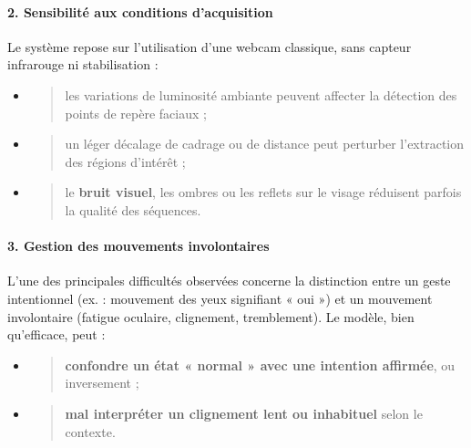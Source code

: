 \documentclass[
]{article}
\begin{document}
\hypertarget{sensibilituxe9-aux-conditions-dacquisition}{%
\paragraph{\texorpdfstring{\textbf{2. Sensibilité aux conditions d'acquisition}}{2. Sensibilité aux conditions d'acquisition}}\label{sensibilituxe9-aux-conditions-dacquisition}}

Le système repose sur l'utilisation d'une webcam classique, sans capteur infrarouge ni stabilisation :

\begin{itemize}
\item
  \begin{quote}
  les variations de luminosité ambiante peuvent affecter la détection des points de repère faciaux ;
  \end{quote}
\item
  \begin{quote}
  un léger décalage de cadrage ou de distance peut perturber l'extraction des régions d'intérêt ;
  \end{quote}
\item
  \begin{quote}
  le \textbf{bruit visuel}, les ombres ou les reflets sur le visage réduisent parfois la qualité des séquences.
  \end{quote}
\end{itemize}

\hypertarget{gestion-des-mouvements-involontaires}{%
\paragraph{\texorpdfstring{\textbf{3. Gestion des mouvements involontaires}}{3. Gestion des mouvements involontaires}}\label{gestion-des-mouvements-involontaires}}

L'une des principales difficultés observées concerne la distinction entre un geste intentionnel (ex. : mouvement des yeux signifiant « oui ») et un mouvement involontaire (fatigue oculaire, clignement, tremblement). Le modèle, bien qu'efficace, peut :

\begin{itemize}
\item
  \begin{quote}
  \textbf{confondre un état « normal » avec une intention affirmée}, ou inversement ;
  \end{quote}
\item
  \begin{quote}
  \textbf{mal interpréter un clignement lent ou inhabituel} selon le contexte.
  \end{quote}
\end{itemize}
\end{document}
